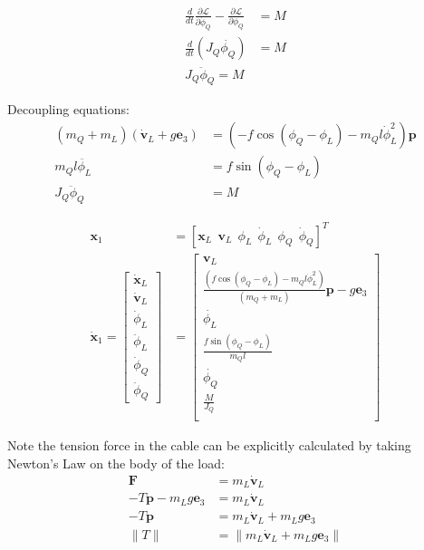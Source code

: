\documentclass[11pt]{article}
\begin{document}
\begin{align*}
\frac{d}{dt} \frac{\partial \mathcal{L}}{\partial \dot{\phi}_Q} - \frac{\partial \mathcal{L}}{\partial \phi_Q} &= M \\
\frac{d}{dt} \left( J_Q \dot{\phi_Q} \right) &= M \\
J_Q \ddot{\phi}_Q = M 
\end{align*}

Decoupling equations:
\begin{align*}
(m_Q+m_L) (\dot{\mathbf{v}}_L + g \mathbf{e}_3) &= (-f \cos(\phi_Q - \phi_L) - m_Q l \dot{\phi}_L^2) \mathbf{p} \\
m_Q l \ddot{\phi_L} &= f \sin(\phi_Q - \phi_L) \\
J_Q \ddot{\phi}_Q &= M 
\end{align*}

\begin{align*}
\mathbf{x}_1 &= [\mathbf{x}_L \ \ \mathbf{v}_L \ \ \phi_L \ \ \dot{\phi}_L \ \  \phi_Q \ \ \dot{\phi}_Q]^T \\
\dot{\mathbf{x}}_1 = 
\begin{bmatrix}
       \dot{\mathbf{x}}_L \\ \dot{\mathbf{v}}_L \\ \dot{\phi}_L \\ \ddot{\phi}_L \\ \dot{\phi}_Q \\ \ddot{\phi}_Q
\end{bmatrix}
&= 
\begin{bmatrix}
       \mathbf{v}_L \\
       \frac{ (f \cos(\phi_Q - \phi_L) - m_Q l \dot{\phi}_L^2) } { (m_Q+m_L) } \mathbf{p} - g \mathbf{e}_3 \\
       \dot{\phi_L} \\
       \frac{ f \sin(\phi_Q - \phi_L) } {m_Q l} \\
       \dot{\phi_Q} \\
       \frac{M}{J_Q} \\
\end{bmatrix}
\end{align*}

Note the tension force in the cable can be explicitly calculated by taking Newton's Law on the body of the load:
\begin{align*}
\mathbf{F} &= m_L \mathbf{\dot{v}}_L \\
- T \mathbf{p} - m_L g \mathbf{e}_3 &= m_L \mathbf{\dot{v}}_L \\
- T \mathbf{p} &= m_L \mathbf{\dot{v}}_L + m_L g \mathbf{e}_3 \\
\| T \| &= \| m_L \mathbf{\dot{v}}_L + m_L g \mathbf{e}_3 \|
\end{align*}
\end{document}

